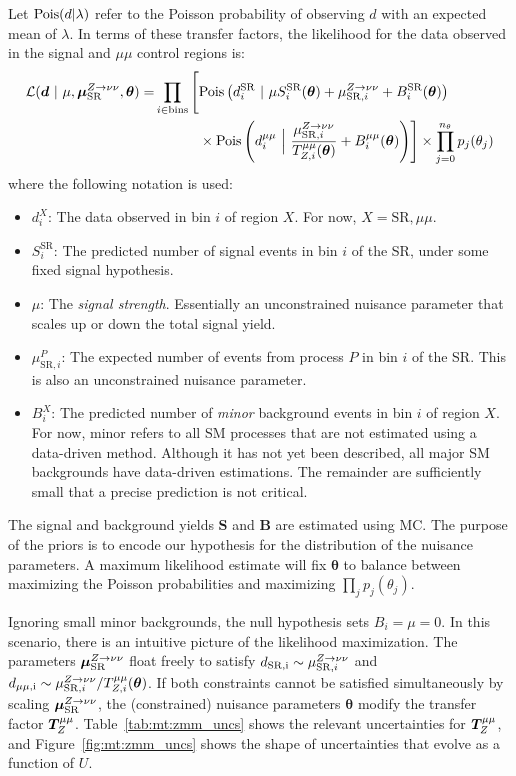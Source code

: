 Let $\mathrm{Pois}(d|\lambda)$ refer to the Poisson probability of observing $d$ with an expected mean of $\lambda$.
In terms of these transfer factors, the likelihood for the data observed in the signal and $\mu\mu$ control regions is:
\begin{align}
    \mathcal{L}(\bm{d} ~|~ \mu,\muz,\bm{\theta}) = & \prod_{i\in\mathrm{bins}} \left[
    \pois\left(d^{\mathrm{SR}}_{i} ~|~ \mu S^{\mathrm{SR}}_{i}(\bm\theta)  + \muzi + B^{\mathrm{SR}}_{i}(\bm\theta)\right) \vphantom{\frac{\muzi}{\Ti{\mu\mu}{Z}(\bm\theta)}}\right. \nonumber \\
    & \left. \phantom{\prod_{i\in\mathrm{bins}}\Big[} \times \pois\left(d^{\mu\mu}_i~\Big|~ \frac{\muzi}{\Ti{\mu\mu}{Z}(\bm\theta)} + B^{\mu\mu}_i(\bm\theta) \right)\right]  \times  \prod_{j=0}^{n_\theta} p_j(\theta_j)
    \label{eq:mt:lhood}
\end{align}
where the following notation is used:
\begin{itemize}
    \item $d^X_i$: The data observed in bin $i$ of region $X$. For now, $X=\mathrm{SR},\mu\mu$.
    \item $S^\mathrm{SR}_i$: The predicted number of signal events in bin $i$ of the SR, under some fixed signal hypothesis.
    \item $\mu$: The \emph{signal strength}. Essentially an unconstrained nuisance parameter that scales up or down the total signal yield.
    \item $\mu_{\mathrm{SR},i}^P$: The expected number of events from process $P$ in bin $i$ of the SR. This is also an unconstrained nuisance parameter.
    \item $B^X_i$: The predicted number of \emph{minor} background events in bin $i$ of region $X$. 
          For now, minor refers to all SM processes that are not estimated using a data-driven method.
          Although it has not yet been described, all major SM backgrounds have data-driven estimations.
          The remainder are sufficiently small that a precise prediction is not critical.
\end{itemize}
The signal and background yields $\bm{S}$ and $\bm{B}$ are estimated using MC.
The purpose of the priors is to encode our hypothesis for the distribution of the nuisance parameters.
A maximum likelihood estimate will fix $\bm\theta$ to balance between maximizing the Poisson probabilities and maximizing $\prod_j p_j(\theta_j)$.

Ignoring small minor backgrounds, the null hypothesis sets $B_i=\mu=0$.
In this scenario, there is an intuitive picture of the likelihood maximization.
The parameters $\bm{\mu}_{\mathrm{SR}}^{Z\rightarrow\nu\nu}$ float freely to satisfy $d_\mathrm{SR,i} \sim \mu_{\mathrm{SR},i}^{Z\rightarrow\nu\nu}$ and $d_\mathrm{\mu\mu,i}\sim \mu_{\mathrm{SR},i}^{Z\rightarrow\nu\nu} / {T}^{\mu\mu}_{Z,i}(\bm\theta)$.
If both constraints cannot be satisfied simultaneously by scaling $\bm{\mu}_{\mathrm{SR}}^{Z\rightarrow\nu\nu}$, the (constrained) nuisance parameters $\bm\theta$ modify the transfer factor $\bm{T}^{\mu\mu}_{Z}$.
Table~\ref{tab:mt:zmm_uncs} shows the relevant uncertainties for $\bm{T}^{\mu\mu}_{Z}$, and Figure~\ref{fig:mt:zmm_uncs} shows the shape of uncertainties that evolve as a function of $U$.

